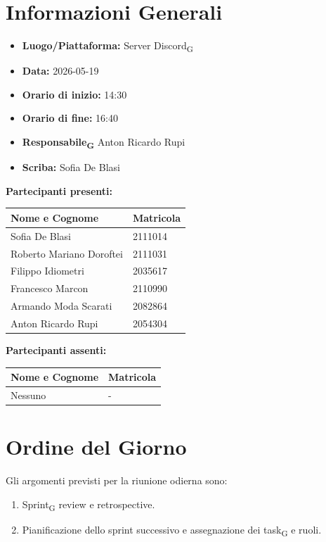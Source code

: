 \section{Informazioni Generali}
\begin{itemize}
	\item \textbf{Luogo/Piattaforma:} Server Discord\textsubscript{G}
	\item \textbf{Data:} 2026-05-19
	\item \textbf{Orario di inizio:} 14:30
	\item \textbf{Orario di fine:} 16:40
	\item \textbf{Responsabile\textsubscript{G}} Anton Ricardo Rupi
	\item \textbf{Scriba:} Sofia De Blasi
\end{itemize}

\vspace{0.5cm}
\textbf{Partecipanti presenti:}
\begin{table}[ht]
	\centering
	\renewcommand{\arraystretch}{1.2}
	\begin{tabularx}{\textwidth}{X l}
		\toprule
		\textbf{Nome e Cognome} & \textbf{Matricola} \\
		\midrule
		Sofia De Blasi & 2111014 \\
		Roberto Mariano Doroftei & 2111031 \\
		Filippo Idiometri & 2035617 \\
		Francesco Marcon & 2110990 \\
		Armando Moda Scarati & 2082864 \\
		Anton Ricardo Rupi & 2054304 \\
		\bottomrule
	\end{tabularx}
\end{table}

\vspace{0.5cm}
\textbf{Partecipanti assenti:}
\begin{table}[ht]
	\centering
	\renewcommand{\arraystretch}{1.2}
	\begin{tabularx}{\textwidth}{X l}
		\toprule
		\textbf{Nome e Cognome} & \textbf{Matricola} \\
		\midrule
		Nessuno & - \\
		\bottomrule
	\end{tabularx}
\end{table}

\section{Ordine del Giorno}
Gli argomenti previsti per la riunione odierna sono:
\begin{enumerate}
	\item Sprint\textsubscript{G} review e retrospective.
	\item Pianificazione dello sprint successivo e assegnazione dei task\textsubscript{G} e ruoli.
\end{enumerate}

